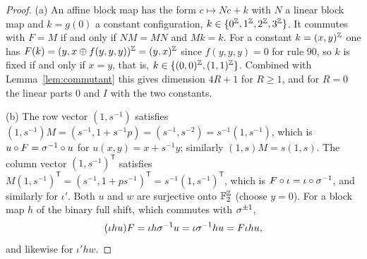\begin{proof}
(a) An affine block map has the form $c\mapsto Nc+k$ with $N$ a linear block map and $k=g(0)$ a constant configuration, $k\in\{0^{\mathbb{Z}},1^{\mathbb{Z}},2^{\mathbb{Z}},3^{\mathbb{Z}}\}$. It commutes with $F=M$ if and only if $NM=MN$ and $Mk=k$. For a constant $k=(x,y)^{\mathbb{Z}}$ one has $F(k)=(y,x\oplus f(y,y,y))^{\mathbb{Z}}=(y,x)^{\mathbb{Z}}$ since $f(y,y,y)=0$ for rule $90$, so $k$ is fixed if and only if $x=y$, that is, $k\in\{(0,0)^{\mathbb{Z}},(1,1)^{\mathbb{Z}}\}$. Combined with Lemma~\ref{lem:commutant} this gives dimension $4R+1$ for $R\ge1$, and for $R=0$ the linear parts $0$ and $I$ with the two constants.

(b) The row vector $(1,s^{-1})$ satisfies $(1,s^{-1})M=(s^{-1},1+s^{-1}p)=(s^{-1},s^{-2})=s^{-1}(1,s^{-1})$, which is $u\circ F=\sigma^{-1}\circ u$ for $u(x,y)=x+s^{-1}y$; similarly $(1,s)M=s(1,s)$. The column vector $(1,s^{-1})^{\mathsf T}$ satisfies $M(1,s^{-1})^{\mathsf T}=(s^{-1},1+ps^{-1})^{\mathsf T}=s^{-1}(1,s^{-1})^{\mathsf T}$, which is $F\circ\iota=\iota\circ\sigma^{-1}$, and similarly for $\iota'$. Both $u$ and $w$ are surjective onto $\mathbb{F}_2^{\mathbb{Z}}$ (choose $y=0$). For a block map $h$ of the binary full shift, which commutes with $\sigma^{\pm1}$,
\[
(\iota h u)F=\iota h\sigma^{-1}u=\iota\sigma^{-1}hu=F\iota hu,
\]
and likewise for $\iota'hw$.


\end{proof}

